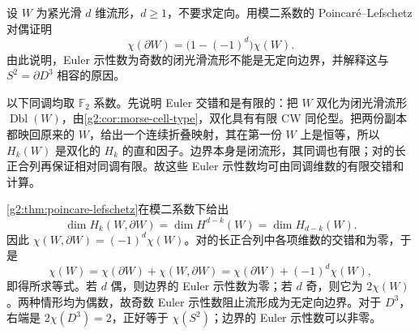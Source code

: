 \BookExercises
\begin{exercise}\label{g2:ex:euler-boundary-formula}
	设 \(W\) 为紧光滑 \(d\) 维流形，\(d\ge1\)，不要求定向。用模二系数的 Poincaré--Lefschetz 对偶证明
	\[
		\chi(\partial W)=\bigl(1-(-1)^d\bigr)\chi(W).
	\]
	由此说明，Euler 示性数为奇数的闭光滑流形不能是无定向边界，并解释这与 \(S^2=\partial D^3\) 相容的原因。
\end{exercise}
\begin{solution}
	以下同调均取 \(\mathbb F_2\) 系数。先说明 Euler 交错和是有限的：把 \(W\) 双化为闭光滑流形 \(\operatorname{Dbl}(W)\)，由\cref{g2:cor:morse-cell-type}，双化具有有限 CW 同伦型。把两份副本都映回原来的 \(W\)，给出一个连续折叠映射，其在第一份 \(W\) 上是恒等，所以 \(H_k(W)\) 是双化的 \(H_k\) 的直和因子。边界本身是闭流形，其同调也有限；对的长正合列再保证相对同调有限。故这些 Euler 示性数均可由同调维数的有限交错和计算。

	\cref{g2:thm:poincare-lefschetz}在模二系数下给出
	\[
		\dim H_k(W,\partial W)=\dim H^{d-k}(W)=\dim H_{d-k}(W).
	\]
	因此 \(\chi(W,\partial W)=(-1)^d\chi(W)\)。对的长正合列中各项维数的交错和为零，于是
	\[
		\chi(W)=\chi(\partial W)+\chi(W,\partial W)
		=\chi(\partial W)+(-1)^d\chi(W),
	\]
	即得所求等式。若 \(d\) 偶，则边界的 Euler 示性数为零；若 \(d\) 奇，则它为 \(2\chi(W)\)。两种情形均为偶数，故奇数 Euler 示性数阻止流形成为无定向边界。对于 \(D^3\)，右端是 \(2\chi(D^3)=2\)，正好等于 \(\chi(S^2)\)；边界的 Euler 示性数可以非零。
\end{solution}

